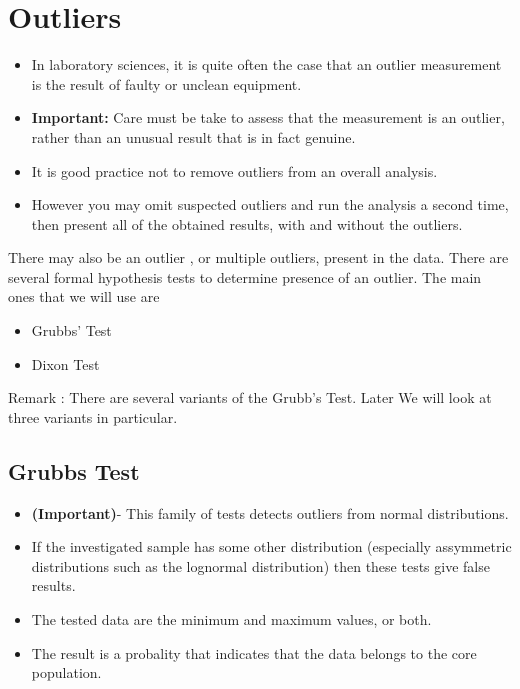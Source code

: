 \documentclass[a4paper,12pt]{article}
\begin{document}

\section{Outliers} 
	

	\begin{itemize}
		\item In laboratory sciences, it is quite often the case that an outlier measurement is the result of faulty or unclean equipment. 
		\item \textbf{Important:} Care must be take to assess that the measurement is an outlier, rather than an unusual result that is in fact genuine.
		\item It is good practice not to remove outliers from an overall analysis. 
		\item However you may omit suspected outliers and run the analysis a second time, then present all of the obtained results, with and without the outliers.
	\end{itemize}



There may also be an outlier , or multiple outliers, present in the data. There are several formal  hypothesis tests to determine presence of an outlier. The main ones that we will use are

\begin{itemize}
	\item Grubbs' Test
	\item Dixon Test
\end{itemize}
\bigskip
Remark : There are several variants of the Grubb's Test. Later We will look at three variants in particular.

\subsection{Grubbs Test }


\begin{itemize}
	\item 
	\textbf{(Important)}- This family of tests detects outliers from normal distributions. 
	\bigskip
	\item If the investigated sample has some other distribution (especially
	assymmetric distributions such as the lognormal distribution) then these tests give false results.\bigskip
	
	\item The tested data are the
	minimum and maximum values, or both.  \bigskip
	\item The result is a probality that indicates that the data
	belongs to the core population.
\end{itemize}
\end{document}
